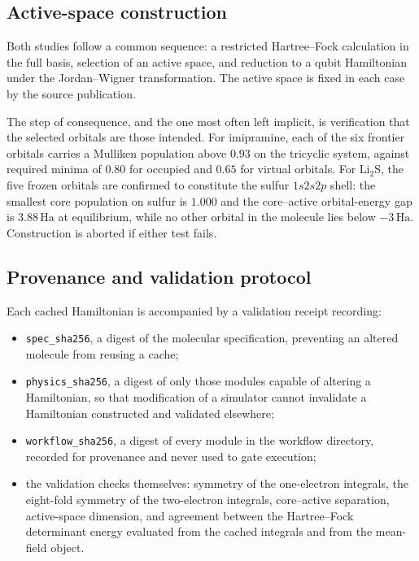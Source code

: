 \documentclass[11pt,a4paper]{article}
\newcommand{\Ha}{\ensuremath{\,\mathrm{Ha}}}
\newcommand{\code}[1]{\texttt{\small #1}}
\newcommand{\LiS}{\texorpdfstring{Li$_2$S}{Li2S}}
\begin{document}
\subsection{Active-space construction}

Both studies follow a common sequence: a restricted Hartree--Fock calculation in
the full basis, selection of an active space, and reduction to a qubit
Hamiltonian under the Jordan--Wigner transformation. The active space is fixed
in each case by the source publication.

The step of consequence, and the one most often left implicit, is verification
that the selected orbitals are those intended. For imipramine, each of the six
frontier orbitals carries a Mulliken population above $0.93$ on the tricyclic
system, against required minima of $0.80$ for occupied and $0.65$ for virtual
orbitals. For \LiS, the five frozen orbitals are confirmed to constitute the
sulfur $1s2s2p$ shell: the smallest core population on sulfur is $1.000$ and
the core--active orbital-energy gap is $3.88\Ha$ at equilibrium, while no other
orbital in the molecule lies below $-3\Ha$. Construction is aborted if either
test fails.

\subsection{Provenance and validation protocol}
\label{sec:methods:prov}

Each cached Hamiltonian is accompanied by a validation receipt recording:

\begin{itemize}[leftmargin=1.2em,itemsep=1pt]
\item \code{spec\_sha256}, a digest of the molecular specification, preventing
an altered molecule from reusing a cache;
\item \code{physics\_sha256}, a digest of only those modules capable of
altering a Hamiltonian, so that modification of a simulator cannot invalidate a
Hamiltonian constructed and validated elsewhere;
\item \code{workflow\_sha256}, a digest of every module in the workflow
directory, recorded for provenance and never used to gate execution;
\item the validation checks themselves: symmetry of the one-electron
integrals, the eight-fold symmetry of the two-electron integrals, core--active
separation, active-space dimension, and agreement between the Hartree--Fock
determinant energy evaluated from the cached integrals and from the mean-field
object.
\end{itemize}
\end{document}
